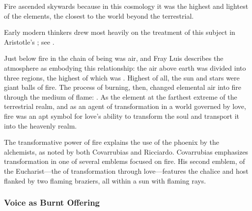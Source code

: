 Fire ascended skywards because in this cosmology it was the highest and
lightest of the elements, the closest to the world beyond the terrestrial.%
\begin{Footnote}
    Early modern thinkers drew most heavily on the treatment of this subject in
    Aristotle's ; see \autocite{Lang:AristotleMedieval}.
\end{Footnote}
Just below fire in the chain of being was air, and Fray Luis describes the
atmosphere as embodying this relationship: the air above earth was divided into
three regions, the highest of which was .%
    \Autocite[207]{LuisdeGranada:Simbolo}
Highest of all, the sun and stars were giant balls of fire.%
    \Autocite[\XXX]{LuisdeGranada:Simbolo}
The process of burning, then, changed elemental air into fire through the
medium of flame: .%
    \Autocite[205]{LuisdeGranada:Simbolo}
As the element at the farthest extreme of the terrestrial realm, and as an
agent of transformation in a world governed by love, fire was an apt symbol for
love's ability to transform the soul and transport it into the heavenly realm.%
\begin{Footnote}
    The transformative power of fire explains the use of the phoenix by the
    alchemists, as noted by both Covarrubias and Ricciardo.  Covarrubias
    emphasizes transformation in one of several emblems focused on fire.
    His second emblem, of the Eucharist---the  of
    transformation through love---features the chalice and host flanked by two
    flaming braziers, all within a sun with flaming rays.
\end{Footnote}

\subsubsection{Voice as Burnt Offering}

